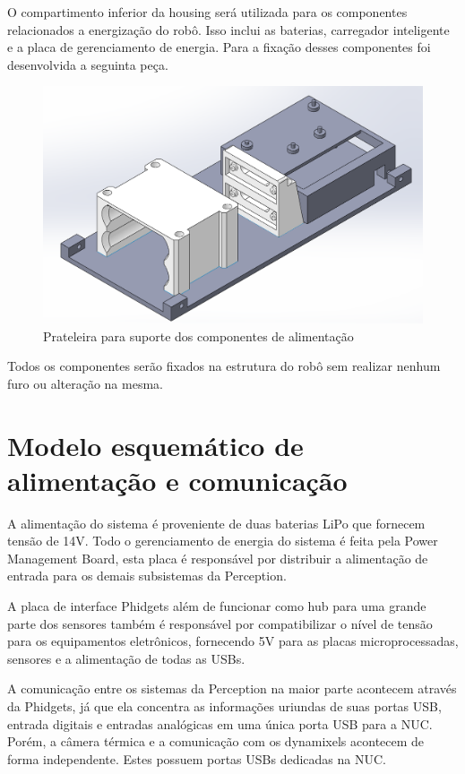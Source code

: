 O compartimento inferior da housing será utilizada para os componentes relacionados a energização do robô. Isso inclui as baterias, carregador inteligente e a placa de gerenciamento de energia. Para a fixação desses componentes foi desenvolvida a seguinta peça.

	\begin{figure}[H]
	\centering
	\includegraphics[width=14cm]{Figures/pecadebaixo.png}
	\caption{Prateleira para suporte dos componentes de alimentação} \label{pecaaliment}
	\end{figure}
	
	Todos os componentes serão fixados na estrutura do robô sem realizar nenhum furo ou alteração na mesma.
\section{Modelo esquemático de alimentação e comunicação}
\label{sec:modesq}

A alimentação do sistema é proveniente de duas baterias LiPo que fornecem tensão de 14V. Todo o gerenciamento de energia do sistema é feita pela Power Management Board, esta placa é responsável por distribuir a alimentação de entrada para os demais subsistemas da Perception. 

A placa de interface Phidgets além de funcionar como hub para uma grande parte dos sensores também é responsável por compatibilizar o nível de tensão para os equipamentos eletrônicos, fornecendo 5V para as placas microprocessadas, sensores e a alimentação de todas as USBs. 

A comunicação entre os sistemas da Perception na maior parte acontecem através da Phidgets, já que ela concentra as informações uriundas de suas portas USB, entrada digitais e entradas analógicas em uma única porta USB para a NUC. Porém, a câmera térmica e a comunicação com os dynamixels acontecem de forma independente. Estes possuem portas USBs dedicadas na NUC.

